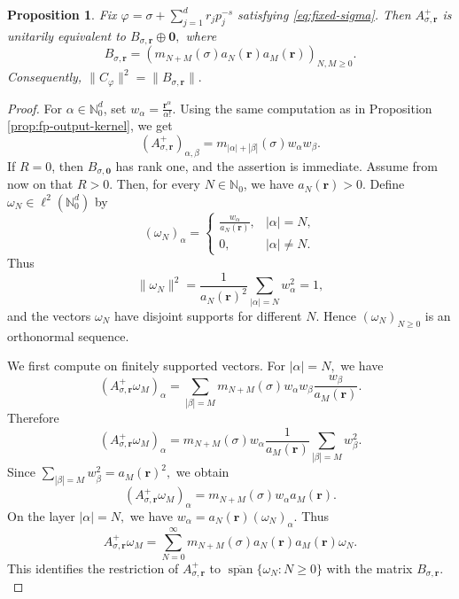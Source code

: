 \documentclass[12pt, reqno]{amsart}
\numberwithin{equation}{section}
\newtheorem{proposition}[theorem]{Proposition}
\begin{document}
\begin{proposition}
\label{prop:finite-prime-total-degree-reduction}
Fix $\varphi=\sigma+\sum_{j=1}^{d}r_jp_j^{-s}$  satisfying  \eqref{eq:fixed-sigma}.
Then
$A_{\sigma,\boldsymbol{r}}^{+}$
is unitarily equivalent to
$B_{\sigma,\boldsymbol{r}}\oplus \mathbf{0},$ where
\[
B_{\sigma,\boldsymbol{r}}
=
\left(
m_{N+M}(\sigma)a_N(\boldsymbol{r})a_M(\boldsymbol{r})
\right)_{N,M\geq 0}.
\]
Consequently, $\|C_{\varphi}\|^{2}
= \|B_{\sigma,\boldsymbol{r}}\|.$

\end{proposition}
\begin{proof}
For $ \alpha\in\mathbb{N}_{0}^{d}$, set  $w_{\alpha} =\frac{\boldsymbol{r}^{\alpha}}{\alpha!}.$ Using the same computation as in Proposition \ref{prop:fp-output-kernel}, we get
\[
(A_{\sigma,\boldsymbol{r}}^{+})_{\alpha,\beta}
=
m_{|\alpha|+|\beta|}(\sigma)w_{\alpha}w_{\beta}.
\]
If $R=0$, then $B_{\sigma,\mathbf 0}$ has rank one, and the assertion is
immediate. Assume from now on that \(R>0\). Then, for every
$N\in\mathbb N_0$, we have $a_N(\boldsymbol r)>0$.
Define $\omega_N\in\ell^{2}(\mathbb{N}_{0}^{d})$
by
\[
(\omega_N)_{\alpha}
=
\begin{cases}
\displaystyle \frac{w_{\alpha}}{a_N(\boldsymbol{r})}, & |\alpha|=N,\\[6pt]
0, & |\alpha|\neq N.
\end{cases}
\]
Thus
\[
\|\omega_N\|^2
=
\frac{1}{a_N(\boldsymbol{r})^2}
\sum_{|\alpha|=N}w_{\alpha}^2
=
1,
\]
and the vectors \(\omega_N\) have disjoint supports for different \(N\). Hence $(\omega_N)_{N\geq 0}$ is an orthonormal sequence.

We first compute  on finitely supported vectors. For
$|\alpha|=N,$ we have
\[
(A_{\sigma,\boldsymbol{r}}^{+}\omega_M)_{\alpha}
=
\sum_{|\beta|=M}
m_{N+M}(\sigma)w_{\alpha}w_{\beta}
\frac{w_{\beta}}{a_M(\boldsymbol{r})}.
\]
Therefore
\[
(A_{\sigma,\boldsymbol{r}}^{+}\omega_M)_{\alpha}
=
m_{N+M}(\sigma)w_{\alpha}
\frac{1}{a_M(\boldsymbol{r})}
\sum_{|\beta|=M}w_{\beta}^{2}.
\]
Since $\sum_{|\beta|=M}w_{\beta}^{2} = a_M(\boldsymbol{r})^{2},$
we obtain
\[
(A_{\sigma,\boldsymbol{r}}^{+}\omega_M)_{\alpha}
=
m_{N+M}(\sigma)w_{\alpha}a_M(\boldsymbol{r}).
\]
On the layer $|\alpha|=N,$ we have
$w_{\alpha}=a_N(\boldsymbol{r})(\omega_N)_{\alpha}.$ Thus
\[
A_{\sigma,\boldsymbol{r}}^{+}\omega_M
=
\sum_{N=0}^{\infty}
m_{N+M}(\sigma)a_N(\boldsymbol{r})a_M(\boldsymbol{r})\omega_N.
\]
This identifies the restriction of \(A_{\sigma,\boldsymbol{r}}^{+}\) to
$\overline{\operatorname{span}}\{\omega_N:N\geq 0\}$ with the matrix $B_{\sigma,\boldsymbol{r}}.$



\end{proof}
\end{document}

